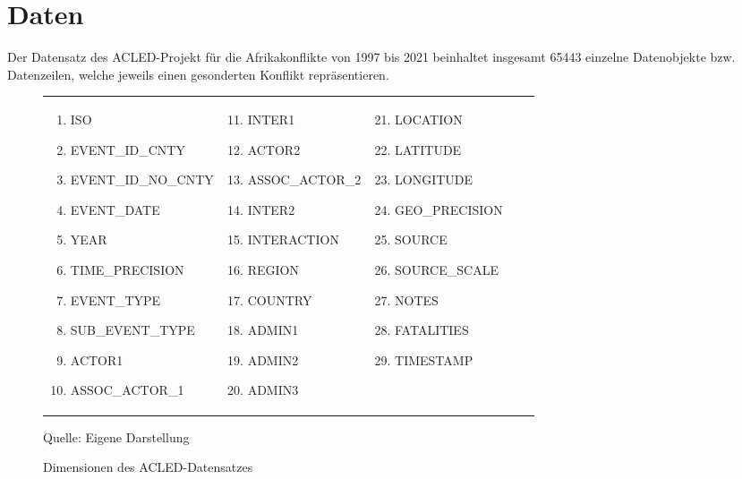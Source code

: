 \documentclass[usegeometry=true]{scrartcl}
\begin{document}
\section{Daten}
Der Datensatz des ACLED-Projekt für die Afrikakonflikte von 1997 bis 2021 beinhaltet insgesamt 65443 einzelne Datenobjekte bzw. Datenzeilen, welche jeweils einen gesonderten Konflikt repräsentieren.

\begin{figure}[]
\begin{center}

\begin{tabular}{lllll}
 \parbox{5.5cm}{
 \begin{enumerate}
  \item ISO
  \item EVENT\_ID\_CNTY
  \item EVENT\_ID\_NO\_CNTY
  \item EVENT\_DATE
  \item YEAR
  \item TIME\_PRECISION
  \item EVENT\_TYPE
  \item SUB\_EVENT\_TYPE
  \item ACTOR1
  \item ASSOC\_ACTOR\_1
 \end{enumerate}}
 &
 \parbox{4.5cm}{
 \begin{enumerate}
 \setcounter{enumi}{10}
  \item INTER1
  \item ACTOR2
  \item ASSOC\_ACTOR\_2
  \item INTER2
  \item INTERACTION
  \item REGION
  \item COUNTRY
  \item ADMIN1
  \item ADMIN2
  \item ADMIN3
 \end{enumerate}}
 &
 \parbox{5cm}{
 \begin{enumerate}
 \setcounter{enumi}{20}
  \item LOCATION
  \item LATITUDE
  \item LONGITUDE
  \item GEO\_PRECISION
  \item SOURCE
  \item SOURCE\_SCALE
  \item NOTES
  \item FATALITIES
  \item TIMESTAMP
 \end{enumerate}}

\end{tabular}

\caption{Dimensionen des ACLED-Datensatzes}
Quelle: Eigene Darstellung
\label{dimensions}
\end{center}
\end{figure}
\end{document}
